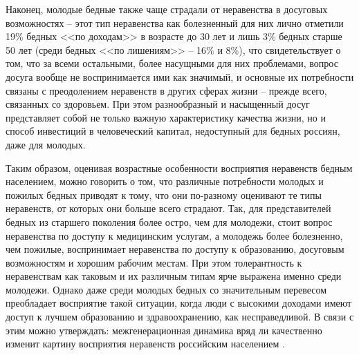 Наконец, молодые бедные также чаще страдали от неравенства в досуговых 
возможностях -- этот тип неравенства как болезненный для них лично отметили 
19\% бедных <<по доходам>> в возрасте до 30 лет и лишь 3\% бедных старше 50 лет 
(среди бедных <<по лишениям>> -- 16\% и 8\%), что свидетельствует о том, что за 
всеми остальными, более насущными для них проблемами, вопрос досуга вообще не 
воспринимается ими как значимый, и основные их потребности связаны с 
преодолением неравенств в других сферах жизни -- прежде всего, связанных со 
здоровьем. При этом разнообразный и насыщенный досуг представляет собой не 
только важную характеристику качества жизни, но и способ инвестиций в 
человеческий капитал, недоступный для бедных россиян, даже для молодых.

Таким образом, оценивая возрастные особенности восприятия неравенств бедным 
населением, можно говорить о том, что различные потребности молодых и пожилых 
бедных приводят к тому, что они по-разному оценивают те типы неравенств, от 
которых они больше всего страдают. Так, для представителей бедных из старшего 
поколения более остро, чем для молодежи, стоит вопрос неравенства по доступу 
к медицинским услугам, а молодежь более болезненно, чем пожилые, воспринимает 
неравенства по доступу к образованию, досуговым возможностям и хорошим рабочим 
местам. При этом толерантность к неравенствам как таковым и их различным типам 
ярче выражена именно среди молодежи. Однако даже среди молодых бедных со 
значительным перевесом преобладает восприятие такой ситуации, когда люди с 
высокими доходами имеют доступ к лучшем образованию и здравоохранению, как 
несправедливой. В связи с этим можно утверждать: межгенерационная динамика 
вряд ли качественно изменит картину восприятия неравенств российским 
населением \cite{vestnik}.

\newpage